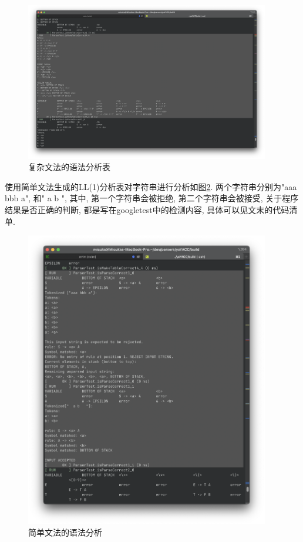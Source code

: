 \begin{figure}[ht!]
	\begin{center}
		\includegraphics[width=0.95\textwidth]{figures/ll1分析表2.png}
	\end{center}
	\caption{复杂文法的语法分析表}
	\label{fig:复杂文法的语法分析表}
\end{figure}

使用简单文法生成的LL(1)分析表对字符串进行分析如图\ref{fig:简单文法的语法分析}. 两个字符串分别为"aaa bbb a", 和"   a
b   ", 其中, 第一个字符串会被拒绝, 第二个字符串会被接受,
关于程序结果是否正确的判断, 都是写在googletest中的检测内容, 具体可以见文末的代码清单.

\begin{figure}[ht!]
	\begin{center}
		\includegraphics[width=0.95\textwidth]{figures/ll1分析输入1.png}
	\end{center}
	\caption{简单文法的语法分析}
	\label{fig:简单文法的语法分析}
\end{figure}

